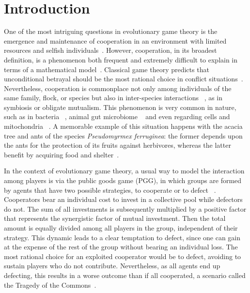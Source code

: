 \documentclass[5p]{elsarticle}
\begin{document}
\section{Introduction}

One of the most intriguing questions in evolutionary game theory is the emergence and maintenance of cooperation in an environment with limited resources and selfish individuals~\cite{Smith82, Nowak2006, Perc2017}. However, cooperation, in its broadest definition, is a phenomenon both frequent and extremely difficult to explain in terms of a mathematical model~\cite{Pennisi2005}.
%
Classical game theory predicts that unconditional betrayal should be the most rational choice in conflict situations~\cite{Szabo2007, nowak_n05}. Nevertheless, cooperation is commonplace not only among individuals of the same family, flock, or species but also in inter-species interactions ~\cite{Nowak2006, wilson_71,  Nowak2011a}, as in symbiosis or obligate mutualism. This phenomenon is very common in nature, such as in bacteria ~\cite{hosokawa2016obligate, yurtsev2016oscillatory}, animal gut microbiome ~\cite{Lewin-Epstein2020} and even regarding cells and mitochondria ~\cite{Henze2003}.  A memorable example of this situation happens with the acacia tree and ants of the species {\it Pseudomyrmex ferruginea}: the former depends upon the ants for the protection of its fruits against herbivores,  whereas the latter benefit by acquiring food and shelter~\cite{janzen1966coevolution}.
%

In the context of evolutionary game theory, a usual way to model the interaction among players is via the public goods game (PGG), in which groups are formed by agents that have two possible strategies, to cooperate or to defect ~\cite{Wardil2017}. Cooperators bear an individual cost to invest in a collective pool while defectors do not. The sum of all investments is subsequently multiplied by a positive factor that represents the synergistic factor of mutual investment. Then the total amount is equally divided among all players in the group, independent of their strategy. 
%
This dynamic leads to a clear temptation to defect, since one can gain at the expense of the rest of the group without bearing an individual loss. The most rational choice for an exploited cooperator would be to defect, avoiding to sustain players who do not contribute. Nevertheless, as all agents end up defecting, this results in a worse outcome than if all cooperated, a scenario called the Tragedy of the Commons~\cite{Szabo2007}.
%
\end{document}
